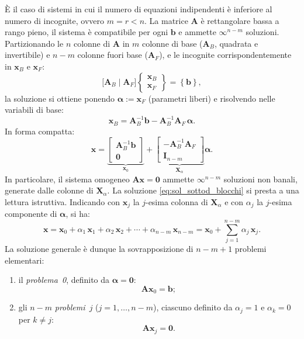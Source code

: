 È il caso di sistemi in cui il numero di equazioni indipendenti	è inferiore al numero di incognite, ovvero $m=r<n$. La matrice
$\bm{A}$ è rettangolare bassa a rango pieno, il sistema è	compatibile per ogni $\bm{b}$ e ammette $\infty^{n-m}$ soluzioni.
Partizionando le $n$ colonne di $\bm{A}$ in $m$ colonne di base ($\bm{A}_B$, quadrata e invertibile) e $n-m$ colonne fuori base ($\bm{A}_F$), e le incognite corrispondentemente in $\bm{x}_B$ e $\bm{x}_F$:
\begin{equation}\label{eq:sist_sottod}
	\bigl[ \bm{A}_B \;\big|\; \bm{A}_F \bigr]
	\left\{ \begin{array}{c} \bm{x}_{B} \\ \hline \bm{x}_{F} \end{array} \right\}
	= \left\{ \bm{b}\right\},
\end{equation}
la soluzione si ottiene ponendo $\bm{\alpha} := \bm{x}_F$ (parametri liberi) e risolvendo nelle variabili di base:
\begin{equation}\label{eq:sol_sottod}
	\bm{x}_B = \bm{A}_B^{-1} \bm{b} - \bm{A}_B^{-1} \bm{A}_F \, \bm{\alpha}.
\end{equation}
In forma compatta:
\begin{equation}\label{eq:sol_sottod_blocchi}
	\bm{x} = \underbrace{\begin{bmatrix} \bm{A}_B^{-1}\bm{b} \\ \bm{0} \end{bmatrix}}_{\bm{x}_0}
	+ \underbrace{\begin{bmatrix} -\bm{A}_B^{-1}\bm{A}_F \\ \bm{I}_{n-m} \end{bmatrix}}_{\bm{X}_\alpha} \bm{\alpha}.
\end{equation}
In particolare, il sistema omogeneo $\bm{A}\bm{x}=\bm{0}$ ammette 	$\infty^{n-m}$ soluzioni non banali, generate dalle colonne di	$\bm{X}_\alpha$.
La soluzione \eqref{eq:sol_sottod_blocchi} si presta a una lettura
istruttiva. Indicando con $\bm{x}_j$ la $j$-esima colonna di
$\bm{X}_\alpha$ e con $\alpha_j$ la $j$-esima componente di
$\bm{\alpha}$, si ha:
\begin{equation}\label{eq:sovrapposizione_sottod}
	\bm{x} = \bm{x}_0
	+ \alpha_1\,\bm{x}_1
	+ \alpha_2\,\bm{x}_2
	+ \cdots
	+ \alpha_{n-m}\,\bm{x}_{n-m}
	= \bm{x}_0 + \sum_{j=1}^{n-m} \alpha_j\,\bm{x}_j.
\end{equation}
La soluzione generale \`e dunque la sovrapposizione di $n-m+1$
problemi elementari:
\begin{enumerate}[label=(\roman*)]
	\item il \textit{problema~0}, definito da $\bm{\alpha}=\bm{0}$:
	\begin{equation}
		\bm{A}\bm{x}_0 = \bm{b};
	\end{equation}
	\item gli $n-m$ \textit{problemi~$j$} ($j=1,\ldots,n-m$),
	ciascuno definito da $\alpha_j=1$ e $\alpha_k=0$ per
	$k\neq j$:
	\begin{equation}
		\bm{A}\bm{x}_j = \bm{0}.
	\end{equation}
\end{enumerate}
